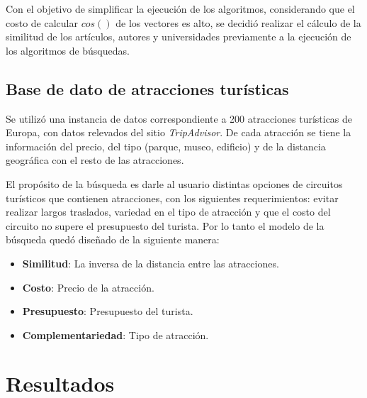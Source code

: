 
Con el objetivo de simplificar la ejecución de los algoritmos, considerando que el costo de calcular $cos()$ de los vectores es alto, se decidió realizar el cálculo de la similitud de los artículos, autores y universidades previamente a la ejecución de los algoritmos de búsquedas.

\subsection{Base de dato de atracciones turísticas}
Se utilizó una instancia de datos correspondiente a 200 atracciones turísticas de Europa, con datos relevados del sitio \textit{TripAdvisor}. De cada atracción se tiene la información del precio, del tipo (parque, museo, edificio) y de la distancia geográfica con el resto de las atracciones.

El propósito de la búsqueda es darle al usuario distintas opciones de circuitos turísticos que contienen atracciones, con los siguientes requerimientos: evitar realizar largos traslados, variedad en el tipo de atracción y que el costo del circuito no supere el presupuesto del turista. Por lo tanto el modelo de la búsqueda quedó diseñado de la siguiente manera: \label{busqueda:atracciones}

\begin{itemize}
	\item \textbf{Similitud}: La inversa de la distancia entre las atracciones. 
	\item \textbf{Costo}: Precio de la atracción. 
	\item \textbf{Presupuesto}: Presupuesto del turista. 
	\item \textbf{Complementariedad}: Tipo de atracción.
\end{itemize}

\section{Resultados}\label{sect:resultados}

